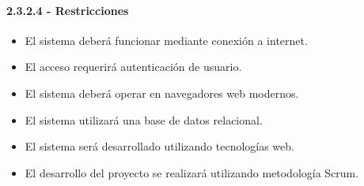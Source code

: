 \paragraph{2.3.2.4 - Restricciones}

\begin{itemize}
    \item El sistema deberá funcionar mediante conexión a internet.   
    \item El acceso requerirá autenticación de usuario.   
    \item El sistema deberá operar en navegadores web modernos.   
    \item El sistema utilizará una base de datos relacional.   
    \item El sistema será desarrollado utilizando tecnologías web.   
    \item El desarrollo del proyecto se realizará utilizando metodología Scrum. 
\end{itemize}
